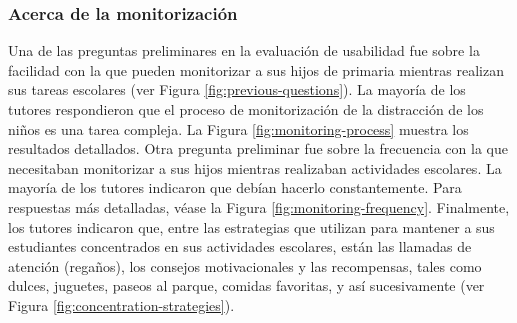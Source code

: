 \documentclass[a4paper,fleqn]{cas-sc}
\begin{document}
			\subsubsection{Acerca de la monitorización}
				Una de las preguntas preliminares en la evaluación de usabilidad fue sobre la facilidad con la que pueden monitorizar a sus hijos de primaria mientras realizan sus tareas escolares (ver Figura \ref{fig:previous-questions}). La mayoría de los tutores respondieron que el proceso de monitorización de la distracción de los niños es una tarea compleja. La Figura \ref{fig:monitoring-process} muestra los resultados detallados. Otra pregunta preliminar fue sobre la frecuencia con la que necesitaban monitorizar a sus hijos mientras realizaban actividades escolares. La mayoría de los tutores indicaron que debían hacerlo constantemente. Para respuestas más detalladas, véase la Figura \ref{fig:monitoring-frequency}. Finalmente, los tutores indicaron que, entre las estrategias que utilizan para mantener a sus estudiantes concentrados en sus actividades escolares, están las llamadas de atención (regaños), los consejos motivacionales y las recompensas, tales como dulces, juguetes, paseos al parque, comidas favoritas, y así sucesivamente (ver Figura \ref{fig:concentration-strategies}).
				
\end{document}
